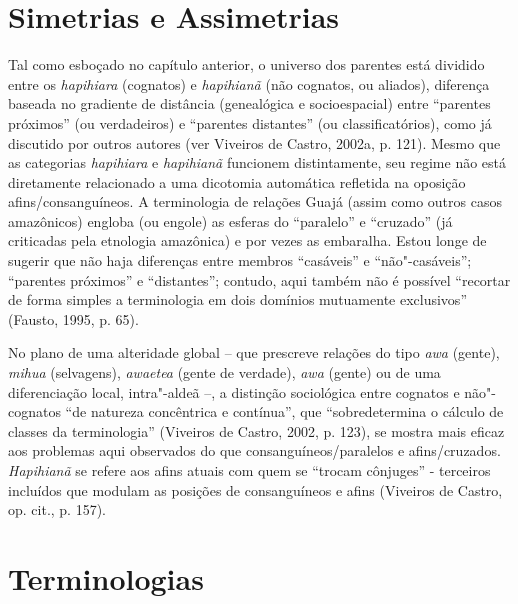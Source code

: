 \section{Simetrias e Assimetrias }\label{simetrias-e-assimetrias}

Tal como esboçado no capítulo anterior, o universo dos parentes está
dividido entre os \emph{hapihiara} (cognatos) e \emph{hapihianã} (não
cognatos, ou aliados), diferença baseada no gradiente de distância
(genealógica e socioespacial) entre ``parentes próximos'' (ou
verdadeiros) e ``parentes distantes'' (ou classificatórios), como já
discutido por outros autores (ver Viveiros de Castro, 2002a, p. 121).
Mesmo que as categorias \emph{hapihiara} e \emph{hapihianã} funcionem
distintamente, seu regime não está diretamente relacionado a uma
dicotomia automática refletida na oposição afins/consanguíneos. A
terminologia de relações Guajá (assim como outros casos amazônicos)
engloba (ou engole) as esferas do ``paralelo'' e ``cruzado'' (já criticadas
pela etnologia amazônica) e por vezes as embaralha. Estou longe de
sugerir que não haja diferenças entre membros ``casáveis'' e
``não"-casáveis''; ``parentes próximos'' e ``distantes''; contudo, aqui
também não é possível ``recortar de forma simples a terminologia em dois
domínios mutuamente exclusivos'' (Fausto, 1995, p. 65).

No plano de uma alteridade global -- que prescreve relações do tipo
\emph{awa} (gente), \emph{mihua} (selvagens), \emph{awaetea} (gente de
verdade), \emph{awa} (gente) ou de uma diferenciação local,
intra"-aldeã --, a distinção sociológica entre cognatos e não"-cognatos ``de
natureza concêntrica e contínua'', que ``sobredetermina o cálculo de
classes da terminologia'' (Viveiros de Castro, 2002, p. 123), se mostra
mais eficaz aos problemas aqui observados do que consanguíneos/paralelos
e afins/cruzados. \emph{Hapihianã} se refere aos afins atuais com quem
se ``trocam cônjuges'' - terceiros incluídos que modulam as posições de
consanguíneos e afins (Viveiros de Castro, op. cit., p. 157).

\section{Terminologias}

